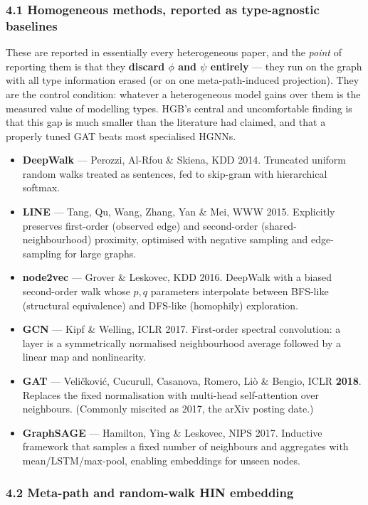 \subsubsection*{4.1 Homogeneous methods, reported as type-agnostic baselines}

These are reported in essentially every heterogeneous paper, and the \emph{point} of reporting
them is that they \textbf{discard $\phi$ and $\psi$ entirely} --- they run on the graph with all
type information erased (or on one meta-path-induced projection). They are the control condition:
whatever a heterogeneous model gains over them is the measured value of modelling types. HGB's
central and uncomfortable finding is that this gap is much smaller than the literature had
claimed, and that a properly tuned GAT beats most specialised HGNNs.

\begin{itemize}\itemsep2pt
\item \textbf{DeepWalk} --- Perozzi, Al-Rfou \& Skiena, KDD 2014. Truncated uniform random walks
  treated as sentences, fed to skip-gram with hierarchical softmax.
\item \textbf{LINE} --- Tang, Qu, Wang, Zhang, Yan \& Mei, WWW 2015. Explicitly preserves
  first-order (observed edge) and second-order (shared-neighbourhood) proximity, optimised with
  negative sampling and edge-sampling for large graphs.
\item \textbf{node2vec} --- Grover \& Leskovec, KDD 2016. DeepWalk with a biased second-order walk
  whose $p,q$ parameters interpolate between BFS-like (structural equivalence) and DFS-like
  (homophily) exploration.
\item \textbf{GCN} --- Kipf \& Welling, ICLR 2017. First-order spectral convolution: a layer is a
  symmetrically normalised neighbourhood average followed by a linear map and nonlinearity.
\item \textbf{GAT} --- Veli\v{c}kovi\'{c}, Cucurull, Casanova, Romero, Li\`{o} \& Bengio, ICLR
  \textbf{2018}. Replaces the fixed normalisation with multi-head self-attention over neighbours.
  (Commonly miscited as 2017, the arXiv posting date.)
\item \textbf{GraphSAGE} --- Hamilton, Ying \& Leskovec, NIPS 2017. Inductive framework that
  samples a fixed number of neighbours and aggregates with mean/LSTM/max-pool, enabling embeddings
  for unseen nodes.
\end{itemize}

\subsubsection*{4.2 Meta-path and random-walk HIN embedding}

